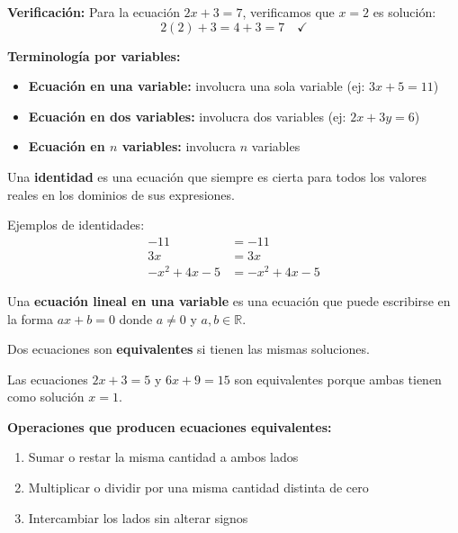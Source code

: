 \begin{example}
\textbf{Verificación:} Para la ecuación $2x + 3 = 7$, verificamos que $x = 2$ es solución:
$$2(2) + 3 = 4 + 3 = 7 \quad \checkmark$$
\end{example}

\textbf{Terminología por variables:}
\begin{itemize}
\item \textbf{Ecuación en una variable:} involucra una sola variable (ej: $3x + 5 = 11$)
\item \textbf{Ecuación en dos variables:} involucra dos variables (ej: $2x + 3y = 6$)
\item \textbf{Ecuación en $n$ variables:} involucra $n$ variables
\end{itemize}

\begin{definition}
Una \textbf{identidad} es una ecuación que siempre es cierta para todos los valores reales en los dominios de sus expresiones.
\end{definition}

\begin{example}
Ejemplos de identidades:
\begin{align}
-11 &= -11\\
3x &= 3x\\
-x^2 + 4x - 5 &= -x^2 + 4x - 5
\end{align}
\end{example}


\begin{definition}
Una \textbf{ecuación lineal en una variable} es una ecuación que puede escribirse en la forma $ax + b = 0$ donde $a \neq 0$ y $a, b \in \mathbb{R}$.
\end{definition}

\begin{definition}
Dos ecuaciones son \textbf{equivalentes} si tienen las mismas soluciones.
\end{definition}

\begin{example}
Las ecuaciones $2x + 3 = 5$ y $6x + 9 = 15$ son equivalentes porque ambas tienen como solución $x = 1$.
\end{example}

\textbf{Operaciones que producen ecuaciones equivalentes:}
\begin{enumerate}
\item Sumar o restar la misma cantidad a ambos lados
\item Multiplicar o dividir por una misma cantidad distinta de cero
\item Intercambiar los lados sin alterar signos
\end{enumerate}

